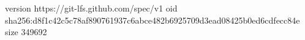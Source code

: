 version https://git-lfs.github.com/spec/v1
oid sha256:d8f1c42c5c78af890761937c6abce482b6925709d3ead08425b0ed6cdfecc84e
size 349692
